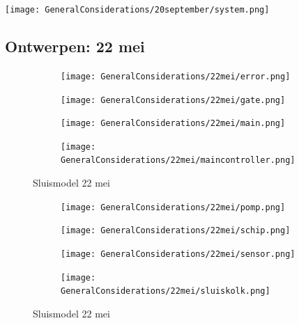 \documentclass{article}
\begin{document}
	\texttt{[image: GeneralConsiderations/20september/system.png]}
	
	\newpage
	\subsection{Ontwerpen: 22 mei}
	\begin{figure}
		\centering
		\begin{subfigure}{0.45\linewidth}
			\texttt{[image: GeneralConsiderations/22mei/error.png]}
			\caption{}
			\label{fig:1a}
		\end{subfigure}\hfill
		\begin{subfigure}{0.45\linewidth}
			\texttt{[image: GeneralConsiderations/22mei/gate.png]}
			\caption{}
			\label{fig:1a}
		\end{subfigure}
		
		\begin{subfigure}{0.45\linewidth}
			\texttt{[image: GeneralConsiderations/22mei/main.png]}
			\caption{}
			\label{fig:1a}
		\end{subfigure}\hfill
		\begin{subfigure}{0.45\linewidth}
			\texttt{[image: GeneralConsiderations/22mei/maincontroller.png]}
			\caption{}
			\label{fig:1a}
		\end{subfigure}
		\caption{Sluismodel 22 mei}
		\label{fig:1}
	\end{figure}
	
	\begin{figure}
		\centering
		\begin{subfigure}{0.45\linewidth}
			\texttt{[image: GeneralConsiderations/22mei/pomp.png]}
			\caption{}
			\label{fig:1a}
		\end{subfigure}\hfill
		\begin{subfigure}{0.45\linewidth}
			\texttt{[image: GeneralConsiderations/22mei/schip.png]}
			\caption{}
			\label{fig:1a}
		\end{subfigure}
		
		\begin{subfigure}{0.45\linewidth}
			\texttt{[image: GeneralConsiderations/22mei/sensor.png]}
			\caption{}
			\label{fig:1a}
		\end{subfigure}\hfill
		\begin{subfigure}{0.45\linewidth}
			\texttt{[image: GeneralConsiderations/22mei/sluiskolk.png]}
			\caption{}
			\label{fig:1a}
		\end{subfigure}
		\caption{Sluismodel 22 mei}
		\label{fig:1}
	\end{figure}
	
\end{document}
